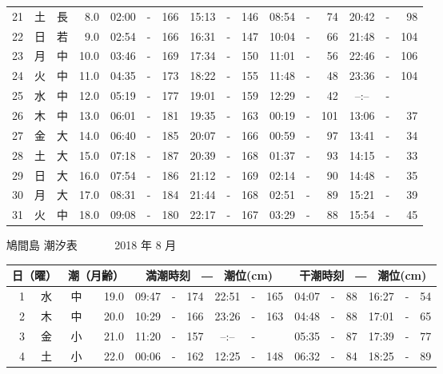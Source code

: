 \documentclass[12pt.a4j]{jsarticle}
\begin{document}
\begin{center}
\begin{table}[ht]
\begin{tabular}{|rc|cr|ccrccr|ccrccr|}
21 & 土 & 長 &  8.0 &  02:00 &-& 166  &  15:13 &-& 146  &   08:54 &-&  74  &   20:42 &-&  98  \\
22 & 日 & 若 &  9.0 &  02:54 &-& 166  &  16:31 &-& 147  &   10:04 &-&  66  &   21:48 &-& 104  \\
23 & 月 & 中 & 10.0 &  03:46 &-& 169  &  17:34 &-& 150  &   11:01 &-&  56  &   22:46 &-& 106  \\
24 & 火 & 中 & 11.0 &  04:35 &-& 173  &  18:22 &-& 155  &   11:48 &-&  48  &   23:36 &-& 104  \\
25 & 水 & 中 & 12.0 &  05:19 &-& 177  &  19:01 &-& 159  &   12:29 &-&  42  &   --:-- &-&     \\
26 & 木 & 中 & 13.0 &  06:01 &-& 181  &  19:35 &-& 163  &   00:19 &-& 101  &   13:06 &-&  37  \\
27 & 金 & 大 & 14.0 &  06:40 &-& 185  &  20:07 &-& 166  &   00:59 &-&  97  &   13:41 &-&  34  \\
28 & 土 & 大 & 15.0 &  07:18 &-& 187  &  20:39 &-& 168  &   01:37 &-&  93  &   14:15 &-&  33  \\
29 & 日 & 大 & 16.0 &  07:54 &-& 186  &  21:12 &-& 169  &   02:14 &-&  90  &   14:48 &-&  35  \\
30 & 月 & 大 & 17.0 &  08:31 &-& 184  &  21:44 &-& 168  &   02:51 &-&  89  &   15:21 &-&  39  \\
31 & 火 & 中 & 18.0 &  09:08 &-& 180  &  22:17 &-& 167  &   03:29 &-&  88  &   15:54 &-&  45  \\
   \hline
   \end{tabular}
\end{table}
\newpage
 {\LARGE 鳩間島  潮汐表　　　}
 {\large 2018 年  8 月}\\
 \begin{table}[ht]
    \begin{tabular}{|rc|cr|ccrccr|ccrccr|}
    \hline
    \multicolumn{2}{|c|}{日（曜）} & \multicolumn{2}{c|}{潮（月齢）} & \multicolumn{6}{c|}{満潮時刻　―　潮位(cm)} & \multicolumn{6}{c|}{干潮時刻　―　潮位(cm)} \\
 \hline
 1 & 水 & 中 & 19.0 &  09:47 &-& 174  &  22:51 &-& 165  &   04:07 &-&  88  &   16:27 &-&  54  \\
 2 & 木 & 中 & 20.0 &  10:29 &-& 166  &  23:26 &-& 163  &   04:48 &-&  88  &   17:01 &-&  65  \\
 3 & 金 & 小 & 21.0 &  11:20 &-& 157  &  --:-- &-&     &   05:35 &-&  87  &   17:39 &-&  77  \\
 4 & 土 & 小 & 22.0 &  00:06 &-& 162  &  12:25 &-& 148  &   06:32 &-&  84  &   18:25 &-&  89  \\

\end{tabular}
\end{table}
\end{center}
\end{document}
